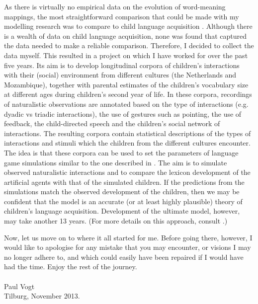 As there is virtually no empirical data on the evolution of word-meaning mappings, the most straightforward comparison that could be made with my modelling research was to compare to child language acquisition \citep{vogtlieven:2010}. Although there is a wealth of data on child language acquisition, none was found that captured the data needed to make a reliable comparison. Therefore, I decided to collect the data myself. This resulted in a project on which I have worked for over the past five years. Its aim is to develop longitudinal corpora of children's interactions with their (social) environment from different cultures (the Netherlands and Mozambique), together with parental estimates of the children's vocabulary size at different ages during children's second year of life. In these corpora, recordings of naturalistic observations are annotated based on the type of interactions (e.g. dyadic vs triadic interactions), the use of gestures such as pointing, the use of feedback, the child-directed speech and the children's social network of interactions. The resulting corpora  contain statistical descriptions of the types of interactions and stimuli which the children from the different cultures encounter. The idea is that these corpora can be used to set the parameters of language game simulations similar to the one described in \citet{vogthaasdijk:2010}. The aim is to simulate observed naturalistic interactions and to compare the lexicon development of the artificial agents with that of the simulated children. If the predictions from the simulations match the observed development of the children, then we may be confident that the model is an accurate (or at least highly plausible) theory of children's language acquisition. Development of the ultimate model, however, may take another 13 years. (For more details on this approach, consult \citeauthor{vogtmastin:2013}.)

 
Now, let us move on to where it all started for me. Before going there, however, I would like to apologise for any mistake that you may encounter, or visions I may no longer adhere to, and which could easily have been repaired if I would have had the time. Enjoy the rest of the journey.\\
\\
\noindent Paul Vogt\\
\noindent Tilburg, November 2013.
